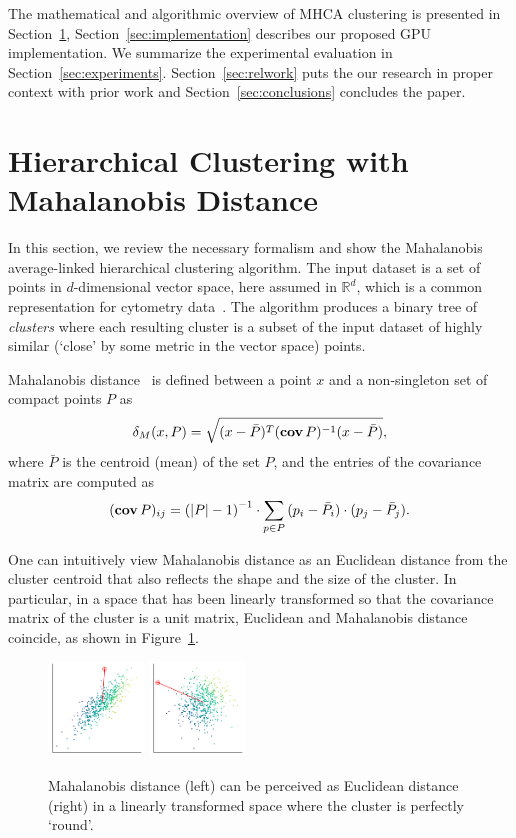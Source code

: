 The mathematical and algorithmic overview of MHCA clustering is presented in Section~\ref{sec:mhca}, Section~\ref{sec:implementation} describes our proposed GPU implementation. We summarize the experimental evaluation in Section~\ref{sec:experiments}. Section~\ref{sec:relwork} puts the our research in proper context with prior work and Section~\ref{sec:conclusions} concludes the paper.


\section{Hierarchical Clustering with Mahalanobis Distance}\label{sec:mhca}
\label{sec:maha}

In this section, we review the necessary formalism and show the Mahalanobis average-linked hierarchical clustering algorithm.
The input dataset is a set of points in $d$-dimensional vector space, here assumed in $\mathbb{R}^d$, which is a common representation for cytometry data~\cite{shapiro2005practical}.
The algorithm produces a binary tree of \emph{clusters} where each resulting cluster is a subset of the input dataset of highly similar (`close' by some metric in the vector space) points.

Mahalanobis distance~\cite{mahalanobis1936generalized} is defined between a point $x$ and a non-singleton set of compact points $P$ as
\[ \delta_M(x,P) = \sqrt{(x-\bar{P})^T(\operatorname{\textbf{cov}} P)^{-1}(x-\bar{P})}, \]
where $\bar{P}$ is the centroid (mean) of the set $P$, and the entries of the covariance matrix are computed as
\[ (\operatorname{\textbf{cov}} P)_{ij} = \left(|P|-1\right)^{-1}\cdot \sum_{p \in P}{(p_i - \bar{P}_i)\cdot(p_j - \bar{P}_j)}. \]

One can intuitively view Mahalanobis distance as an Euclidean distance from the cluster centroid that also reflects the shape and the size of the cluster.
In particular, in a space that has been linearly transformed so that the covariance matrix of the cluster is a unit matrix, Euclidean and Mahalanobis distance coincide, as shown in Figure~\ref{fig:maha}.

\begin{figure}[t]
\centering
\includegraphics[width=1in]{Mahalanobis/img/maha1.pdf}\quad%
\includegraphics[width=1in]{Mahalanobis/img/maha2.pdf}
\caption{Mahalanobis distance (left) can be perceived as Euclidean distance (right) in a linearly transformed space where the cluster is perfectly `round'.
}
\label{fig:maha}
\end{figure}

